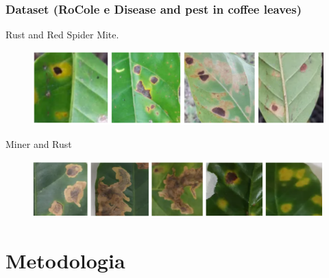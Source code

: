 \documentclass[aspectratio=169]{beamer}
\begin{document}





\begin{frame}
    \frametitle{Dataset (RoCole e Disease and pest in coffee leaves)}

    \centering
    Rust and Red Spider Mite.
    \begin{figure}
        \centering
        \includegraphics[scale = 0.9]{img/RocoleExample.png}
        \label{fig:enter-label}
    \end{figure}

    \centering
    Miner and Rust
    \begin{figure}
        \centering
        \includegraphics[scale = 0.8]{img/DesiaseandpestExemple.png}
        \label{fig:enter-label}
    \end{figure}


\end{frame}




\section{Metodologia}
\end{document}
